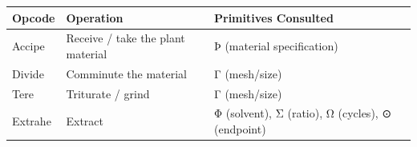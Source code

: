 \documentclass[12pt,a4paper]{article}
\begin{document}
\begin{longtable}[]{@{}lll@{}}
\toprule
\begin{minipage}[b]{0.30\columnwidth}\raggedright
Opcode\strut
\end{minipage} & \begin{minipage}[b]{0.30\columnwidth}\raggedright
Operation\strut
\end{minipage} & \begin{minipage}[b]{0.30\columnwidth}\raggedright
Primitives Consulted\strut
\end{minipage}\tabularnewline
\midrule
\endhead
\begin{minipage}[t]{0.30\columnwidth}\raggedright
Accipe\strut
\end{minipage} & \begin{minipage}[t]{0.30\columnwidth}\raggedright
Receive / take the plant material\strut
\end{minipage} & \begin{minipage}[t]{0.30\columnwidth}\raggedright
Þ (material specification)\strut
\end{minipage}\tabularnewline
\begin{minipage}[t]{0.30\columnwidth}\raggedright
Divide\strut
\end{minipage} & \begin{minipage}[t]{0.30\columnwidth}\raggedright
Comminute the material\strut
\end{minipage} & \begin{minipage}[t]{0.30\columnwidth}\raggedright
Γ (mesh/size)\strut
\end{minipage}\tabularnewline
\begin{minipage}[t]{0.30\columnwidth}\raggedright
Tere\strut
\end{minipage} & \begin{minipage}[t]{0.30\columnwidth}\raggedright
Triturate / grind\strut
\end{minipage} & \begin{minipage}[t]{0.30\columnwidth}\raggedright
Γ (mesh/size)\strut
\end{minipage}\tabularnewline
\begin{minipage}[t]{0.30\columnwidth}\raggedright
Extrahe\strut
\end{minipage} & \begin{minipage}[t]{0.30\columnwidth}\raggedright
Extract\strut
\end{minipage} & \begin{minipage}[t]{0.30\columnwidth}\raggedright
Φ (solvent), Σ (ratio), Ω (cycles), ⊙ (endpoint)\strut

\end{minipage}
\end{longtable}
\end{document}

